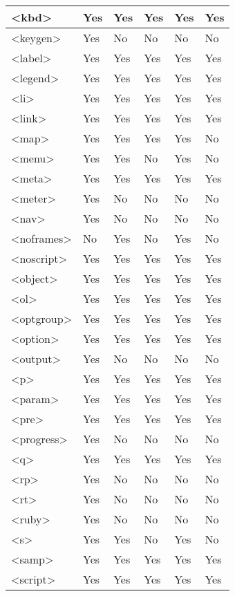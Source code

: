 \begin{longtable}{|l|l|l|l|l|l|}
\hline
<kbd>			&Yes	&Yes			&Yes	&Yes				&Yes	\\
\hline
<keygen>			&Yes	&No				&No		&No					&No		\\
\hline
<label>			&Yes	&Yes			&Yes	&Yes				&Yes	\\
\hline
<legend>			&Yes	&Yes			&Yes	&Yes				&Yes	\\
\hline
<li>				&Yes	&Yes			&Yes	&Yes				&Yes	\\
\hline
<link>			&Yes	&Yes			&Yes	&Yes				&Yes	\\
\hline
<map>			&Yes	&Yes			&Yes	&Yes				&No		\\
\hline
<menu>			&Yes	&Yes			&No		&Yes				&No		\\
\hline
<meta>			&Yes	&Yes			&Yes	&Yes				&Yes	\\
\hline
<meter>			&Yes	&No				&No		&No					&No		\\
\hline
<nav>			&Yes	&No				&No		&No					&No		\\
\hline
<noframes>		&No		&Yes			&No		&Yes				&No		\\
\hline
<noscript>		&Yes	&Yes			&Yes	&Yes				&Yes	\\
\hline
<object>			&Yes	&Yes			&Yes	&Yes				&Yes	\\
\hline
<ol>				&Yes	&Yes			&Yes	&Yes				&Yes	\\
\hline
<optgroup>		&Yes	&Yes			&Yes	&Yes				&Yes	\\
\hline
<option>			&Yes	&Yes			&Yes	&Yes				&Yes	\\
\hline
<output>			&Yes	&No				&No		&No					&No		\\
\hline
<p>				&Yes	&Yes			&Yes	&Yes				&Yes	\\
\hline
<param>			&Yes	&Yes			&Yes	&Yes				&Yes	\\
\hline
<pre>			&Yes	&Yes			&Yes	&Yes				&Yes	\\
\hline
<progress>		&Yes	&No				&No		&No					&No		\\
\hline
<q>				&Yes	&Yes			&Yes	&Yes				&Yes	\\
\hline
<rp>				&Yes	&No				&No		&No					&No		\\
\hline
<rt>				&Yes	&No				&No		&No					&No		\\
\hline
<ruby>			&Yes	&No				&No		&No					&No		\\
\hline
<s>				&Yes	&Yes			&No		&Yes				&No		\\
\hline
<samp>			&Yes	&Yes			&Yes	&Yes				&Yes	\\
\hline
<script>			&Yes	&Yes			&Yes	&Yes				&Yes	\\
\hline

\end{longtable}
